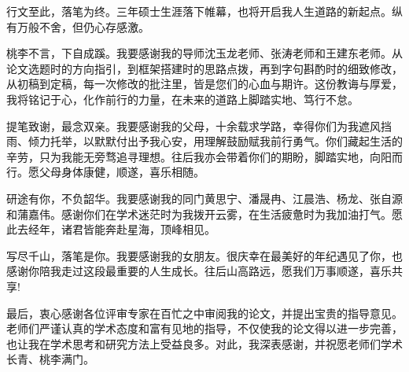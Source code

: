 \begin{thanks}
行文至此，落笔为终。三年硕士生涯落下帷幕，也将开启我人生道路的新起点。纵有万般不舍，但仍心存感激。

桃李不言，下自成蹊。我要感谢我的导师沈玉龙老师、张涛老师和王建东老师。从论文选题时的方向指引，到框架搭建时的思路点拨，再到字句斟酌时的细致修改，从初稿到定稿，每一次修改的批注里，皆是您们的心血与期许。这份教诲与厚爱，我将铭记于心，化作前行的力量，在未来的道路上脚踏实地、笃行不怠。

提笔致谢，最念双亲。我要感谢我的父母，十余载求学路，幸得你们为我遮风挡雨、倾力托举，以默默付出予我心安，用理解鼓励赋我前行勇气。你们藏起生活的辛劳，只为我能无旁骛追寻理想。往后我亦会带着你们的期盼，脚踏实地，向阳而行。愿父母身体康健，顺遂，喜乐相随。

研途有你，不负韶华。我要感谢我的同门黄思宁、潘晟冉、江晨浩、杨龙、张自源和蒲嘉伟。感谢你们在学术迷茫时为我拨开云雾，在生活疲惫时为我加油打气。愿此去经年，诸君皆能奔赴星海，顶峰相见。

写尽千山，落笔是你。我要感谢我的女朋友。很庆幸在最美好的年纪遇见了你，也感谢你陪我走过这段最重要的人生成长。往后山高路远，愿我们万事顺遂，喜乐共享!

最后，衷心感谢各位评审专家在百忙之中审阅我的论文，并提出宝贵的指导意见。老师们严谨认真的学术态度和富有见地的指导，不仅使我的论文得以进一步完善，也让我在学术思考和研究方法上受益良多。对此，我深表感谢，并祝愿老师们学术长青、桃李满门。

\end{thanks}